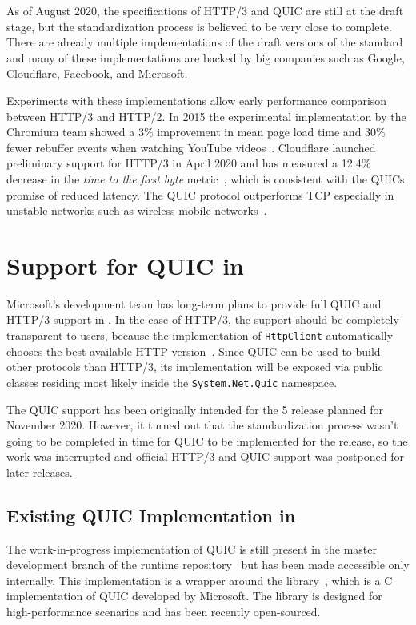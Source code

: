 As of August 2020, the specifications of HTTP/3 and QUIC are still at the draft stage, but the
standardization process is believed to be very close to complete. There are already multiple
implementations of the draft versions of the standard and many of these implementations are backed
by big companies such as Google, Cloudflare, Facebook, and Microsoft.

Experiments with these implementations allow early performance comparison between HTTP/3 and HTTP/2.
In 2015 the experimental implementation by the Chromium team showed a 3\% improvement in mean page
load time and 30\% fewer rebuffer events when watching YouTube videos~\cite{Wilk2015}. Cloudflare
launched preliminary support for HTTP/3 in April 2020 and has measured a 12.4\% decrease in the
\textit{time to the first byte} metric~\cite{Tellakula2020}, which is consistent with the QUICs
promise of reduced latency. The QUIC protocol outperforms TCP especially in unstable networks such
as wireless mobile networks~\cite{Cook2017}.

\section{Support for QUIC in \dotnet{}}

Microsoft's \dotnet{} development team has long-term plans to provide full QUIC and HTTP/3 support
in \dotnet{}. In the case of HTTP/3, the support should be completely transparent to users, because
the implementation of \texttt{HttpClient} automatically chooses the best available HTTP
version~\cite{HttpClientDocs}. Since QUIC can be used to build other protocols than HTTP/3, its
implementation will be exposed via public classes residing most likely inside the
\texttt{System.Net.Quic} namespace.

The QUIC support has been originally intended for the \dotnet{} 5 release planned for November 2020.
However, it turned out that the standardization process wasn't going to be completed in time for
QUIC to be implemented for the release, so the work was interrupted and official HTTP/3 and QUIC
support was postponed for later releases.


\subsection*{Existing QUIC Implementation in \dotnet{}}

The work-in-progress implementation of QUIC is still present in the master development branch of the
\dotnet{} runtime repository~\cite{dotnetGithub} but has been made accessible only internally. This
implementation is a wrapper around the \libmsquic{} library~\cite{msquicGithub}, which is a C
implementation of QUIC developed by Microsoft. The \libmsquic{} library is designed for
high-performance scenarios and has been recently open-sourced.

